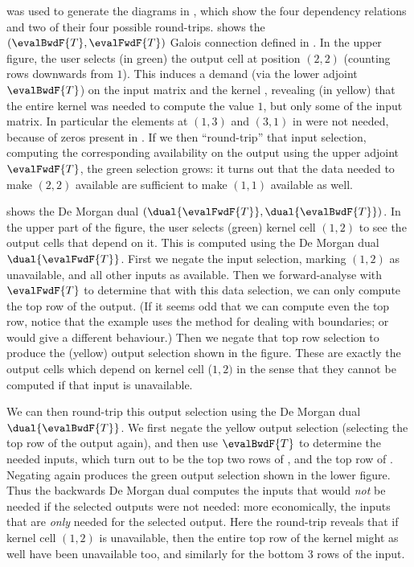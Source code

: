 

\OurLanguage{} was used to generate the diagrams in , which show the four dependency relations and two of their four possible round-trips.  shows the $(\evalBwdF{T}, \evalFwdF{T})$ Galois connection defined in . In the upper figure, the user selects (in green) the output cell at position $(2,2)$ (counting rows downwards from $1$). This induces a demand (via the lower adjoint $\evalBwdF{T}$) on the input matrix  and the kernel , revealing (in yellow) that the entire kernel was needed to compute the value $1$, but only some of the input matrix. In particular the elements at $(1,3)$ and $(3,1)$ in  were not needed, because of zeros present in . If we then ``round-trip'' that input selection, computing the corresponding availability on the output using the upper adjoint $\evalFwdF{T}$, the green selection grows: it turns out that the data needed to make $(2,2)$ available are sufficient to make $(1,1)$ available as well.

 shows the De Morgan dual $(\dual{\evalFwdF{T}}, \dual{\evalBwdF{T}})$. In the upper part of the figure, the user selects (green) kernel cell $(1, 2)$ to see the output cells that depend on it. This is computed using the De Morgan dual $\dual{\evalFwdF{T}}$. First we negate the input selection, marking $(1, 2)$ as unavailable, and all other inputs as available. Then we forward-analyse with $\evalFwdF{T}$ to determine that with this data selection, we can only compute the top row of the output. (If it seems odd that we can compute even the top row, notice that the example uses the method  for dealing with boundaries;  or  would give a different behaviour.) Then we negate that top row selection to produce the (yellow) output selection shown in the figure. These are exactly the output cells which depend on kernel cell ($1, 2)$ in the sense that they cannot be computed if that input is unavailable.

We can then round-trip this output selection using the De Morgan dual $\dual{\evalBwdF{T}}$. We first negate the yellow output selection (selecting the top row of the output again), and then use $\evalBwdF{T}$ to determine the needed inputs, which turn out to be the top two rows of , and the top row of . Negating again produces the green output selection shown in the lower figure. Thus the backwards De Morgan dual computes the inputs that would \emph{not} be needed if the selected outputs were not needed: more economically, the inputs that are \emph{only} needed for the selected output. Here the round-trip reveals that if kernel cell $(1, 2)$ is unavailable, then the entire top row of the kernel might as well have been unavailable too, and similarly for the bottom 3 rows of the input.

